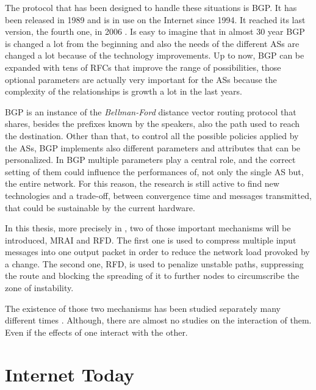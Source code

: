 The protocol that has been designed to handle these situations is  \ac{BGP}.
It has been released in \num{1989} and is in use on the Internet since \num{1994}.
It reached its last version, the fourth one, in \num{2006} \cite{rfc4271}.
Is easy to imagine that in almost \num{30} year \ac{BGP} is changed a lot from
the beginning and also the needs of the different \acp{AS} are changed a lot
because of the technology improvements.
Up to now, \ac{BGP} can be expanded with tens of \acp{RFC} that improve the
range of possibilities, those optional parameters are actually very important
for the \acp{AS} because the complexity of the relationships is growth a lot
in the last years.

\ac{BGP} is an instance of the \textit{Bellman-Ford} distance vector routing
protocol that shares, besides the prefixes known by the speakers, also the
path used to reach the destination.
Other than that, to control all the possible policies applied by the \acp{AS},
\ac{BGP} implements also different parameters and attributes that can be
personalized.
In \ac{BGP} multiple parameters play a central role, and the correct setting
of them could influence the performances of, not only the single \ac{AS} but,
the entire network.
For this reason, the research is still active to find new technologies and
a trade-off, between convergence time and messages transmitted, that could
be sustainable by the current hardware.

In this thesis, more precisely in , two of those important
mechanisms will be introduced, \ac{MRAI} and \ac{RFD}.
The first one is used to compress multiple input messages into one
output packet in order to reduce the network load provoked by a change.
The second one, \ac{RFD}, is used to penalize unstable paths, suppressing
the route and blocking the spreading of it to further nodes to circumscribe
the zone of instability.

The existence of those two mechanisms has been studied separately many different
times \cite{fabrikant2011there,daggitt2018rate,qiu2005optimal,gray2020bgp}.
Although, there are almost no studies on the interaction of them.
Even if the effects of one interact with the other.

\section{Internet Today}
\label{sec:internet_today}

